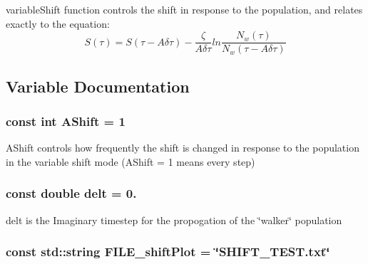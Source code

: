variable\-Shift function controls the shift in response to the population, and relates exactly to the equation\-: \[ S(\tau) = S(\tau - A\delta \tau) - \frac{\zeta}{A \delta \tau} ln\frac{N_w (\tau)}{N_w (\tau - A\delta \tau)} \] 

\subsection{Variable Documentation}
\hypertarget{UEG__MAIN__binarytest_8C_a1b1b50ff28122bf25bbd141938893243}{
\subsubsection[{A\-Shift}]{\setlength{\rightskip}{0pt plus 5cm}const int A\-Shift = 1}}\label{UEG__MAIN__binarytest_8C_a1b1b50ff28122bf25bbd141938893243}
A\-Shift controls how frequently the shift is changed in response to the population in the variable shift mode (A\-Shift = 1 means every step) \hypertarget{UEG__MAIN__binarytest_8C_aa06f5594efa32a5569766c36690b4a22}{
\subsubsection[{delt}]{\setlength{\rightskip}{0pt plus 5cm}const double delt = 0.}}\label{UEG__MAIN__binarytest_8C_aa06f5594efa32a5569766c36690b4a22}
delt is the Imaginary timestep for the propogation of the \char`\"{}walker\char`\"{} population \hypertarget{UEG__MAIN__binarytest_8C_a8947574152f3a6b27e38b1f5ea8f61de}{
\subsubsection[{F\-I\-L\-E\-\_\-shift\-Plot}]{\setlength{\rightskip}{0pt plus 5cm}const std\-::string F\-I\-L\-E\-\_\-shift\-Plot = \char`\"{}S\-H\-I\-F\-T\-\_\-\-T\-E\-S\-T.\-txt\char`\"{}}}\label{UEG__MAIN__binarytest_8C_a8947574152f3a6b27e38b1f5ea8f61de}
